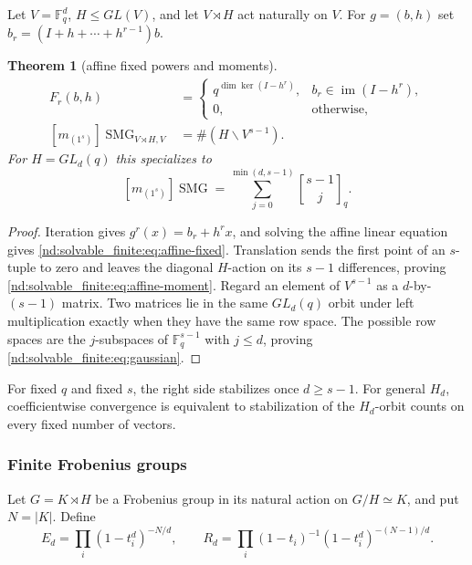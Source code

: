 \documentclass[10pt]{article}
\newcommand{\SMG}{\operatorname{SMG}}
\newcommand{\MGF}{\SMG}
\newcommand{\F}{\mathbb F}
\newcommand{\im}{\operatorname{im}}
\newcommand{\qbinom}[2]{\genfrac{[}{]}{0pt}{}{#1}{#2}_q}
\newtheorem{theorem}{Theorem}
\begin{document}
Let $V=\F_q^d$, $H\leq GL(V)$, and let $V\rtimes H$ act naturally on $V$.
For $g=(b,h)$ set $b_r=(I+h+\cdots+h^{r-1})b$.

\begin{theorem}[affine fixed powers and moments]\label{nd:solvable_finite:thm:affine}
\begin{align}
 F_r(b,h)&=\begin{cases}
 q^{\dim\ker(I-h^r)},&b_r\in\im(I-h^r),\\
 0,&\text{otherwise},
 \end{cases}\label{nd:solvable_finite:eq:affine-fixed}\\
 [m_{(1^s)}]\MGF_{V\rtimes H,V}
 &=\#(H\backslash V^{s-1}).\label{nd:solvable_finite:eq:affine-moment}
\end{align}
For $H=GL_d(q)$ this specializes to
\begin{equation}
 \boxed{[m_{(1^s)}]\MGF
 =\sum_{j=0}^{\min(d,s-1)}\qbinom{s-1}{j}.}\label{nd:solvable_finite:eq:gaussian}
\end{equation}
\end{theorem}

\begin{proof}
Iteration gives $g^r(x)=b_r+h^rx$, and solving the affine linear equation
gives \eqref{nd:solvable_finite:eq:affine-fixed}.  Translation sends the first point of an
$s$-tuple to zero and leaves the diagonal $H$-action on its $s-1$
differences, proving \eqref{nd:solvable_finite:eq:affine-moment}.  Regard an element of
$V^{s-1}$ as a $d$-by-$(s-1)$ matrix.  Two matrices lie in the same
$GL_d(q)$ orbit under left multiplication exactly when they have the same row
space.  The possible row spaces are the $j$-subspaces of $\F_q^{s-1}$ with
$j\leq d$, proving \eqref{nd:solvable_finite:eq:gaussian}.
\end{proof}

For fixed $q$ and fixed $s$, the right side stabilizes once $d\geq s-1$.
For general $H_d$, coefficientwise convergence is equivalent to stabilization
of the $H_d$-orbit counts on every fixed number of vectors.

\subsubsection{Finite Frobenius groups}

Let $G=K\rtimes H$ be a Frobenius group in its natural action on
$G/H\simeq K$, and put $N=|K|$.  Define
\[
 E_d=\prod_i(1-t_i^d)^{-N/d},\qquad
 R_d=\prod_i(1-t_i)^{-1}(1-t_i^d)^{-(N-1)/d}.
\]
\end{document}
